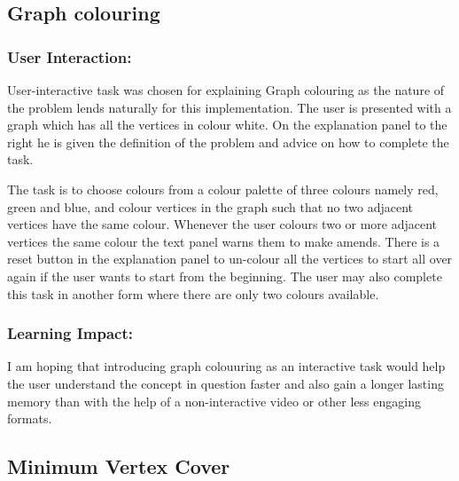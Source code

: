 \subsection{Graph colouring}
\label{story: coloring}
\subsubsection{User Interaction:}
User-interactive task was chosen for explaining Graph colouring as the nature
of the problem lends naturally for this implementation. The user is presented with a graph
which has all the vertices in colour white. On the explanation panel to the
right he is given the definition of the problem and advice on how to complete
the task.  

The task is to choose colours from a colour palette of three colours namely red,
green and blue, and colour vertices in the graph such that no two adjacent
vertices have the same colour. Whenever the user colours two or more adjacent
vertices the same colour the text panel warns them to make amends. There is a
reset button in the explanation panel to un-colour all the vertices to start all
over again if the user wants to start from the beginning. The user may also complete this task in another form where there are only two colours available.

\subsubsection{Learning Impact:}
I am hoping that introducing graph colouuring as an interactive task would help the user understand the concept in question faster and also gain a longer lasting memory than with the help of a non-interactive video or other less engaging formats.

\subsection{Minimum Vertex Cover}
\label{story: vertexcover}
